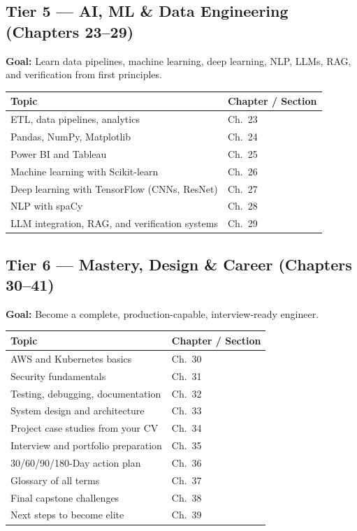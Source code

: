 \documentclass[12pt, a4paper, oneside]{book}
\begin{document}
\subsection{Tier 5 — AI, ML \& Data Engineering (Chapters 23--29)}

\textbf{Goal:} Learn data pipelines, machine learning, deep learning, NLP, LLMs, RAG, and verification from first principles.

\begin{longtable}{p{} p{}}
\toprule
\textbf{Topic} & \textbf{Chapter / Section} \\
\midrule
\endhead
ETL, data pipelines, analytics & Ch.\ 23 \\
Pandas, NumPy, Matplotlib & Ch.\ 24 \\
Power BI and Tableau & Ch.\ 25 \\
Machine learning with Scikit-learn & Ch.\ 26 \\
Deep learning with TensorFlow (CNNs, ResNet) & Ch.\ 27 \\
NLP with spaCy & Ch.\ 28 \\
LLM integration, RAG, and verification systems & Ch.\ 29 \\
\bottomrule
\end{longtable}

\subsection{Tier 6 — Mastery, Design \& Career (Chapters 30--41)}

\textbf{Goal:} Become a complete, production-capable, interview-ready engineer.

\begin{longtable}{p{} p{}}
\toprule
\textbf{Topic} & \textbf{Chapter / Section} \\
\midrule
\endhead
AWS and Kubernetes basics & Ch.\ 30 \\
Security fundamentals & Ch.\ 31 \\
Testing, debugging, documentation & Ch.\ 32 \\
System design and architecture & Ch.\ 33 \\
Project case studies from your CV & Ch.\ 34 \\
Interview and portfolio preparation & Ch.\ 35 \\
30/60/90/180-Day action plan & Ch.\ 36 \\
Glossary of all terms & Ch.\ 37 \\
Final capstone challenges & Ch.\ 38 \\
Next steps to become elite & Ch.\ 39 \\
\bottomrule
\end{longtable}
\end{document}
